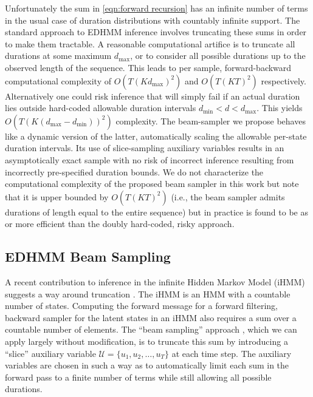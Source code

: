 Unfortunately the sum in \eqref{eqn:forward recursion} has an infinite number of terms in the usual case of  duration distributions with countably infinite support. The standard approach to EDHMM inference involves truncating these sums in order to make them tractable. 
A reasonable computational artifice is to truncate all durations at some maximum $d_\mathrm{max}$, or to consider all possible durations up to the observed length of the sequence. This leads to per sample, forward-backward computational complexity of $O(T(Kd_\mathrm{max})^2)$  and  $O(T(KT)^2)$ respectively.  Alternatively one could risk inference that will simply fail if an actual duration lies outside hard-coded allowable duration intervals $d_\mathrm{min}<d<d_\mathrm{max}$.  This yields $O(T(K(d_\mathrm{max}-d_\mathrm{min}))^2)$ complexity.
The beam-sampler we propose behaves like a dynamic version of the latter, automatically scaling the allowable per-state duration intervals.   Its use of slice-sampling auxiliary variables results in an asymptotically exact sample with no risk of incorrect inference resulting from incorrectly pre-specified duration bounds.   We do not characterize the computational complexity of the proposed beam sampler in this work but note that it is upper bounded by $O(T(KT)^2)$ (i.e., the beam sampler admits durations of length equal to the entire sequence) but in practice is found to be as  or more efficient than the doubly hard-coded, risky approach.


\subsection{EDHMM Beam Sampling}

A recent contribution to inference 
in 
the infinite Hidden Markov Model (iHMM) \cite{Beal2002} suggests a way around truncation \cite{vanGael2008}.  The iHMM is an HMM with a countable number of states.  Computing the forward message for a forward filtering, backward sampler for the latent states in an iHMM also requires a sum over a countable number of elements.  
The ``beam sampling'' approach  \cite{vanGael2008}, which we can apply largely without modification, is to truncate this sum by introducing a ``slice'' \cite{Neal2003} auxiliary variable $\mathcal{U} = \{u_1, u_2, \ldots,u_T\}$ at each time step.  The auxiliary variables are chosen in such a way as to automatically limit each sum in the forward pass to a finite number of terms while still allowing all possible durations.%

